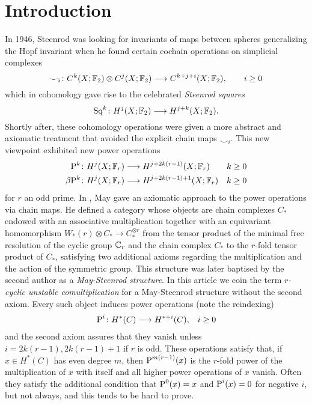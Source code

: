 
\section{Introduction} \label{s:introduction}

In 1946, Steenrod was looking for invariants of maps between spheres generalizing the Hopf invariant when he found certain cochain operations on simplicial complexes 
\[\smile_i\colon C^k(X;\mathbb{F}_2)\otimes C^j(X;\mathbb{F}_2)\longrightarrow C^{k+j+i}(X;\mathbb{F}_2),\qquad i\geq 0\]
which in cohomology gave rise to the celebrated \emph{Steenrod squares}
\[\operatorname{Sq}^{k}\colon H^j(X;\mathbb{F}_2)\longrightarrow H^{j+k}(X;\mathbb{F}_2).\]
Shortly after, these cohomology operations were given a more abstract and axiomatic treatment that avoided the explicit chain maps $\smile_i$. This new viewpoint exhibited new power operations
\begin{align*}
\mathrm{P}^{k}\colon H^j(X;\mathbb{F}_r)&\longrightarrow H^{j+2k(r-1)}(X;\mathbb{F}_r) & k\geq 0 \\
\beta \mathrm{P}^k\colon H^j(X;\mathbb{F}_r)&\longrightarrow H^{j+2k(r-1)+1}(X;\mathbb{F}_r) & k\geq 0
\end{align*}
for $r$ an odd prime. In \cite{may1970general}, May gave an axiomatic approach to the power operations via chain maps. He defined a category whose objects are chain complexes $C_*$ endowed with an associative multiplication together with an equivariant homomorphism $W_*(r)\otimes C_*\to C_*^{\otimes r}$ from the tensor product of the minimal free resolution of the cyclic group $\mathbb{C}_r$ and the chain complex $C_*$ to the $r$-fold tensor product of $C_*$, satisfying two additional axioms regarding the multiplication and the action of the symmetric group. This structure was later baptised by the second author as a \emph{May-Steenrod structure}. In this article we coin the term \emph{$r$-cyclic unstable comultiplication} for a May-Steenrod structure without the second axiom. Every such object induces power operations (note the reindexing)
\begin{align*}
    \operatorname{P}^i\colon H^*(C)&\longrightarrow H^{*+i}(C), & i\geq 0
\end{align*}
and the second axiom assures that they vanish unless $i = 2k(r-1), 2k(r-1)+1$ if $r$ is odd. These operations satisfy that, if $x\in H^*(C)$ has even degree $m$, then $\operatorname{P}^{m(r-1)}(x)$ is the $r$-fold power of the multiplication of $x$ with itself and all higher power operations of $x$ vanish. Often they satisfy the additional condition that $\operatorname{P}^0(x) = x$ and $\operatorname{P}^i(x) = 0$ for negative $i$, but not always, and this tends to be hard to prove.

